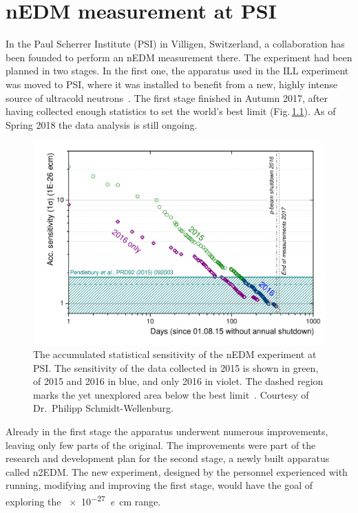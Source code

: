 \chapter{nEDM measurement at PSI}
\label{ch:nedm-at-psi-apparatus}

In the Paul Scherrer Institute (PSI) in Villigen, Switzerland, a collaboration has been founded to perform an nEDM measurement there. The experiment had been planned in two stages. In the first one, the apparatus used in the ILL experiment was moved to PSI, where it was installed to benefit from a new, highly intense source of ultracold neutrons~\cite{Lauss2014}. The first stage finished in Autumn 2017, after having collected enough statistics to set the world's best limit (Fig.\,\ref{fig:nEDM_accumulated_sensitivity}). As of Spring 2018 the data analysis is still ongoing.

\begin{figure}
  \centering
  \includegraphics[width=\linewidth]{gfx/nEDMatPSI/accumulated_sensitivity.pdf}
  \caption{The accumulated statistical sensitivity of the nEDM experiment at PSI\@. The sensitivity of the data collected in 2015 is shown in green, of 2015 and 2016 in blue, and only 2016 in violet. The dashed region marks the yet unexplored area below the best limit~\cite{Pendlebury2015}. Courtesy of Dr.\ Philipp Schmidt-Wellenburg.}\label{fig:nEDM_accumulated_sensitivity}
\end{figure}

Already in the first stage the apparatus underwent numerous improvements, leaving only few parts of the original. The improvements were part of the research and development plan for the second stage, a newly built apparatus called n2EDM\@. The new experiment, designed by the personnel experienced with running, modifying and improving the first stage, would have the goal of exploring the \SI{e-27}{\elementarycharge\centi\meter} range.


